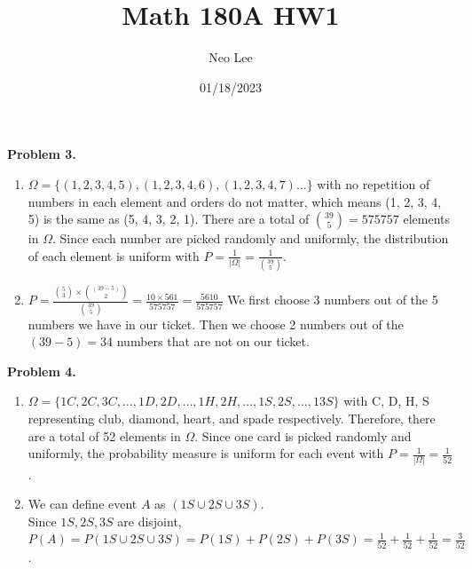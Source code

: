 \documentclass{article}
\title{Math 180A HW1}
\author{Neo Lee}
\date{01/18/2023}
\begin{document}
 

\maketitle 

\textbf{Problem 3.}
\begin{enumerate}[label={(\alph*)}]
    \item 
    $\Omega = \{(1, 2, 3, 4, 5), (1, 2, 3, 4, 6), (1, 2, 3, 4, 7)\dots\}$ with no repetition of numbers in each element and orders do not matter, which means (1, 2, 3, 4, 5) is the same as (5, 4, 3, 2, 1). 
    There are a total of ${39 \choose 5} = 575757$ elements in $\Omega$. 
    \smallbreak
    Since each number are picked randomly and uniformly, the distribution of each element is uniform with $P = \frac{1}{|\Omega|} = \frac{1}{{39 \choose 5}}$.

    \item
    $P = \frac{{5 \choose 3} \times {(39 - 5) \choose 2}}{{39 \choose 5}} = \frac{10 \times 561}{575757} = \frac{5610}{575757}$ 
    \smallbreak
    We first choose 3 numbers out of the 5 numbers we have in our ticket. Then we choose 2 numbers out of the $(39 - 5) = 34$ numbers that are not on our ticket.
\end{enumerate}
\bigbreak

\textbf{Problem 4.}
\begin{enumerate}[label={(\alph*)}]
    \item 
    $\Omega = \{1C, 2C, 3C, \dots ,1D, 2D, \dots, 1H, 2H, \dots, 1S, 2S, \dots, 13S \}$ with C, D, H, S representing club, diamond, heart, and spade respectively.
    Therefore, there are a total of 52 elements in $\Omega$. 
    \smallbreak
    Since one card is picked randomly and uniformly, the probability measure is uniform for each event with $P = \frac{1}{|\Omega|} = \frac{1}{52}$.

    \item 
    We can define event $A$ as $(1S \cup 2S \cup 3S)$. \\
    Since $1S, 2S, 3S$ are disjoint, $P(A) = P(1S \cup 2S \cup 3S) = P(1S) + P(2S) + P(3S) = \frac{1}{52} + \frac{1}{52} + \frac{1}{52} = \frac{3}{52}$.
\end{enumerate}
\pagebreak
    
\end{document}
